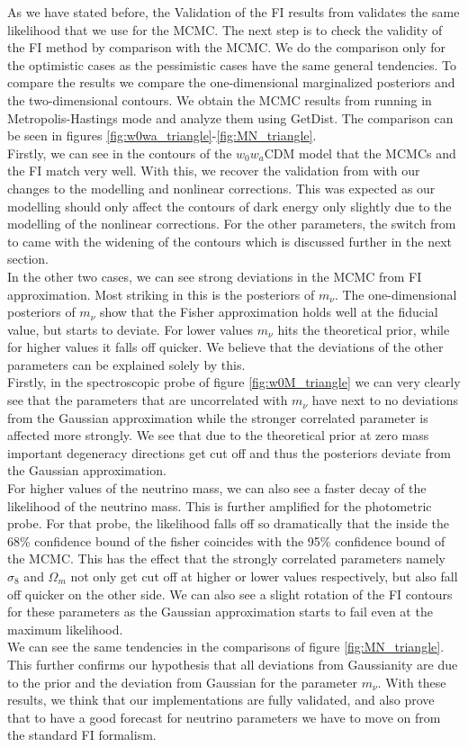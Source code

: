 \documentclass[../main.tex]{subfiles}
\begin{document}
As we have stated before, the Validation of the FI results from \montefisher validates the same likelihood that we use for the MCMC. The next step is to check the validity of the FI method by comparison with the MCMC. We do the comparison only for the optimistic cases as the pessimistic cases have the same general tendencies. To compare the results we compare the one-dimensional marginalized posteriors and the two-dimensional contours. We obtain the MCMC results from \montepython running in Metropolis-Hastings mode and analyze them using GetDist. The comparison can be seen in figures \ref{fig:w0wa_triangle}-\ref{fig:MN_triangle}.\\
Firstly, we can see in the contours of the $w_0w_a$CDM model that the MCMCs and the FI match very well. With this, we recover the validation from \cite{casas2023euclid} with our changes to the modelling and nonlinear corrections. This was expected as our modelling should only affect the contours of dark energy only slightly due to the modelling of the nonlinear corrections. For the other parameters, the switch from \halofit to \hmcode came with the widening of the contours which is discussed further in the next section.\\
In the other two cases, we can see strong deviations in the MCMC from FI approximation. Most striking in this is the posteriors of $m_\nu$.  The one-dimensional posteriors of $m_\nu$ show that the Fisher approximation holds well at the fiducial value, but starts to deviate. For lower values $m_\nu$ hits the theoretical prior, while for higher values it falls off quicker. We believe that the deviations of the other parameters can be explained solely by this.\\
Firstly, in the spectroscopic probe of figure \ref{fig:w0M_triangle} we can very clearly see that the parameters that are uncorrelated with $m_\nu$ have next to no deviations from the Gaussian approximation while the stronger correlated parameter is affected more strongly. We see that due to the theoretical prior at zero mass important degeneracy directions get cut off and thus the posteriors deviate from the Gaussian approximation.\\
For higher values of the neutrino mass, we can also see a faster decay of the likelihood of the neutrino mass. This is further amplified for the photometric probe. For that probe, the likelihood falls off so dramatically that the inside the 68\% confidence bound of the fisher coincides with the 95\% confidence bound of the MCMC. This has the effect that the strongly correlated parameters namely $\sigma_8$ and $\Omega_m$ not only get cut off at higher or lower values respectively, but also fall off quicker on the other side. We can also see a slight rotation of the FI contours for these parameters as the Gaussian approximation starts to fail even at the maximum likelihood.\\
We can see the same tendencies in the comparisons of figure \ref{fig:MN_triangle}. This further confirms our hypothesis that all deviations from Gaussianity are due to the prior and the deviation from Gaussian for the parameter $m_\nu$. With these results, we think that our implementations are fully validated, and also prove that to have a good forecast for neutrino parameters we have to move on from the standard FI formalism. 
\end{document}
